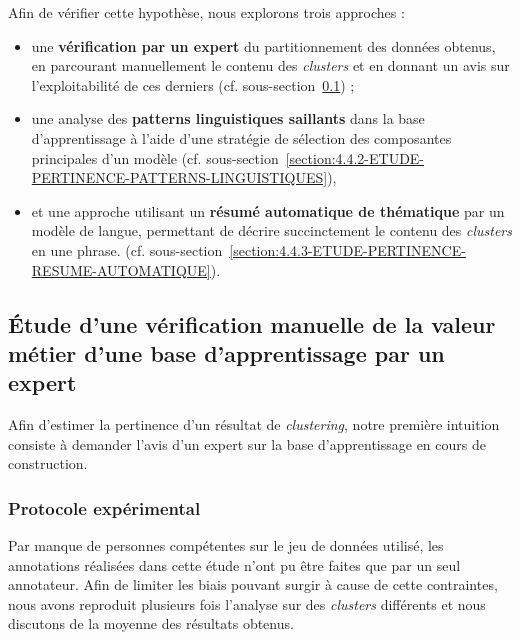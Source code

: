 	Afin de vérifier cette hypothèse, nous explorons trois approches :
	\begin{itemize}
		\item une \textbf{vérification par un expert} du partitionnement des données obtenus, en parcourant manuellement le contenu des \textit{clusters} et en donnant un avis sur l'exploitabilité de ces derniers (cf. sous-section~\ref{section:4.4.1-ETUDE-PERTINENCE-VERIFICATION-MANUELLE}) ;
		\item une analyse des \textbf{patterns linguistiques saillants} dans la base d'apprentissage à l'aide d'une stratégie de sélection des composantes principales d'un modèle (cf. sous-section~\ref{section:4.4.2-ETUDE-PERTINENCE-PATTERNS-LINGUISTIQUES}),
		\item et une approche utilisant un \textbf{résumé automatique de thématique} par un modèle de langue, permettant de décrire succinctement le contenu des \textit{clusters} en une phrase. (cf. sous-section~\ref{section:4.4.3-ETUDE-PERTINENCE-RESUME-AUTOMATIQUE}).
	\end{itemize}
	
	
	\subsection{Étude d'une vérification manuelle de la valeur métier d'une base d'apprentissage par un expert}
	\label{section:4.4.1-ETUDE-PERTINENCE-VERIFICATION-MANUELLE}
		
		Afin d'estimer la pertinence d'un résultat de \textit{clustering}, notre première intuition consiste à demander l'avis d'un expert sur la base d'apprentissage en cours de construction.
	
		\subsubsection{Protocole expérimental}
			
			\begin{leftBarWarning}
				Par manque de personnes compétentes sur le jeu de données utilisé, les annotations réalisées dans cette étude n'ont pu être faites que par un seul annotateur.
				Afin de limiter les biais pouvant surgir à cause de cette contraintes, nous avons reproduit plusieurs fois l'analyse sur des \textit{clusters} différents et nous discutons de la moyenne des résultats obtenus.
			\end{leftBarWarning}
			
